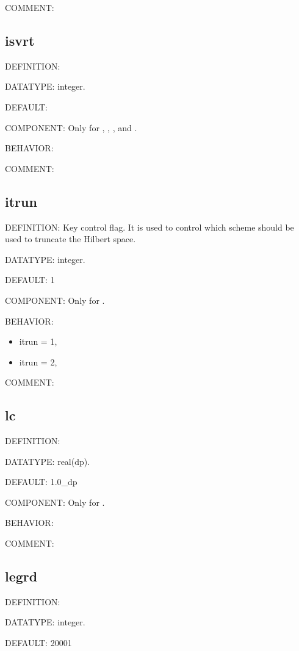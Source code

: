 {\color{olive}COMMENT:}

\subsection{isvrt}
{\color{red}DEFINITION:}

{\color{green}DATATYPE:} integer.

{\color{blue}DEFAULT:}

{\color{brown}COMPONENT:} Only for {\gardenia}, {\narcissus}, {\lavender}, and {\manjushaka}.

{\color{purple}BEHAVIOR:}

{\color{olive}COMMENT:}

\subsection{itrun}
{\color{red}DEFINITION:} Key control flag. It is used to control which scheme should be used to truncate the Hilbert space.

{\color{green}DATATYPE:} integer.

{\color{blue}DEFAULT:} 1

{\color{brown}COMPONENT:} Only for {\manjushaka}.

{\color{purple}BEHAVIOR:}
\begin{itemize}
\item itrun = 1,
\item itrun = 2,
\end{itemize}

{\color{olive}COMMENT:}

\subsection{lc}
{\color{red}DEFINITION:}

{\color{green}DATATYPE:} real(dp).

{\color{blue}DEFAULT:} 1.0\_dp

{\color{brown}COMPONENT:} Only for {\narcissus}.

{\color{purple}BEHAVIOR:}

{\color{olive}COMMENT:}

\subsection{legrd}
{\color{red}DEFINITION:}

{\color{green}DATATYPE:} integer.

{\color{blue}DEFAULT:} 20001

